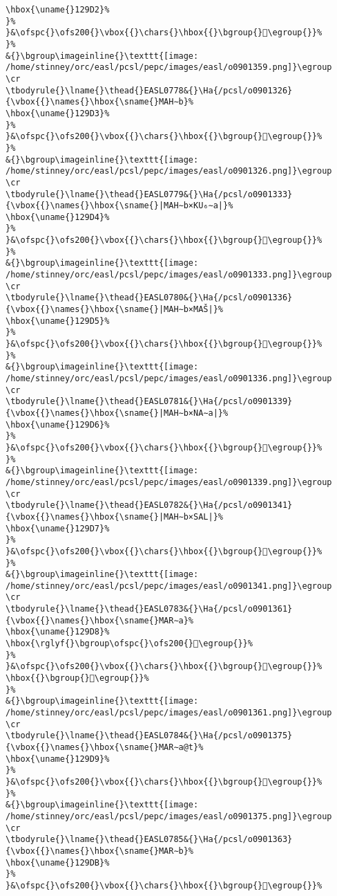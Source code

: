 \begin{verbatim}
\hbox{\uname{}129D2}%
}%
}&\ofspc{}\ofs200{}\vbox{{}\chars{}\hbox{{}\bgroup{}𒧒\egroup{}}%
}%
&{}\bgroup\imageinline{}\texttt{[image: /home/stinney/orc/easl/pcsl/pepc/images/easl/o0901359.png]}\egroup
\cr
\tbodyrule{}\lname{}\thead{}EASL0778&{}\Ha{/pcsl/o0901326}{\vbox{{}\names{}\hbox{\sname{}MAH∼b}%
\hbox{\uname{}129D3}%
}%
}&\ofspc{}\ofs200{}\vbox{{}\chars{}\hbox{{}\bgroup{}𒧓\egroup{}}%
}%
&{}\bgroup\imageinline{}\texttt{[image: /home/stinney/orc/easl/pcsl/pepc/images/easl/o0901326.png]}\egroup
\cr
\tbodyrule{}\lname{}\thead{}EASL0779&{}\Ha{/pcsl/o0901333}{\vbox{{}\names{}\hbox{\sname{}|MAH∼b×KU₆∼a|}%
\hbox{\uname{}129D4}%
}%
}&\ofspc{}\ofs200{}\vbox{{}\chars{}\hbox{{}\bgroup{}𒧔\egroup{}}%
}%
&{}\bgroup\imageinline{}\texttt{[image: /home/stinney/orc/easl/pcsl/pepc/images/easl/o0901333.png]}\egroup
\cr
\tbodyrule{}\lname{}\thead{}EASL0780&{}\Ha{/pcsl/o0901336}{\vbox{{}\names{}\hbox{\sname{}|MAH∼b×MAŠ|}%
\hbox{\uname{}129D5}%
}%
}&\ofspc{}\ofs200{}\vbox{{}\chars{}\hbox{{}\bgroup{}𒧕\egroup{}}%
}%
&{}\bgroup\imageinline{}\texttt{[image: /home/stinney/orc/easl/pcsl/pepc/images/easl/o0901336.png]}\egroup
\cr
\tbodyrule{}\lname{}\thead{}EASL0781&{}\Ha{/pcsl/o0901339}{\vbox{{}\names{}\hbox{\sname{}|MAH∼b×NA∼a|}%
\hbox{\uname{}129D6}%
}%
}&\ofspc{}\ofs200{}\vbox{{}\chars{}\hbox{{}\bgroup{}𒧖\egroup{}}%
}%
&{}\bgroup\imageinline{}\texttt{[image: /home/stinney/orc/easl/pcsl/pepc/images/easl/o0901339.png]}\egroup
\cr
\tbodyrule{}\lname{}\thead{}EASL0782&{}\Ha{/pcsl/o0901341}{\vbox{{}\names{}\hbox{\sname{}|MAH∼b×SAL|}%
\hbox{\uname{}129D7}%
}%
}&\ofspc{}\ofs200{}\vbox{{}\chars{}\hbox{{}\bgroup{}𒧗\egroup{}}%
}%
&{}\bgroup\imageinline{}\texttt{[image: /home/stinney/orc/easl/pcsl/pepc/images/easl/o0901341.png]}\egroup
\cr
\tbodyrule{}\lname{}\thead{}EASL0783&{}\Ha{/pcsl/o0901361}{\vbox{{}\names{}\hbox{\sname{}MAR∼a}%
\hbox{\uname{}129D8}%
\hbox{\rglyf{}\bgroup\ofspc{}\ofs200{}𒧘\egroup{}}%
}%
}&\ofspc{}\ofs200{}\vbox{{}\chars{}\hbox{{}\bgroup{}𒧘\egroup{}}%
\hbox{{}\bgroup{}𒧚\egroup{}}%
}%
&{}\bgroup\imageinline{}\texttt{[image: /home/stinney/orc/easl/pcsl/pepc/images/easl/o0901361.png]}\egroup
\cr
\tbodyrule{}\lname{}\thead{}EASL0784&{}\Ha{/pcsl/o0901375}{\vbox{{}\names{}\hbox{\sname{}MAR∼a@t}%
\hbox{\uname{}129D9}%
}%
}&\ofspc{}\ofs200{}\vbox{{}\chars{}\hbox{{}\bgroup{}𒧙\egroup{}}%
}%
&{}\bgroup\imageinline{}\texttt{[image: /home/stinney/orc/easl/pcsl/pepc/images/easl/o0901375.png]}\egroup
\cr
\tbodyrule{}\lname{}\thead{}EASL0785&{}\Ha{/pcsl/o0901363}{\vbox{{}\names{}\hbox{\sname{}MAR∼b}%
\hbox{\uname{}129DB}%
}%
}&\ofspc{}\ofs200{}\vbox{{}\chars{}\hbox{{}\bgroup{}𒧛\egroup{}}%

\end{verbatim}
